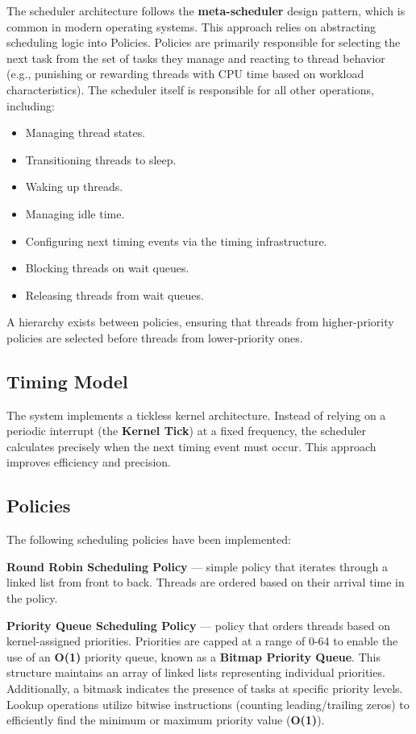 \documentclass[a4paper,10pt,twoside]{report}
\theoremstyle{definition}
\begin{document}
The scheduler architecture follows the \textbf{meta-scheduler} design pattern, which is common in modern operating systems. This approach relies on abstracting scheduling logic into Policies. Policies are primarily responsible for selecting the next task from the set of tasks they manage and reacting to thread behavior (e.g., punishing or rewarding threads with CPU time based on workload characteristics). The scheduler itself is responsible for all other operations, including:
\begin{itemize}
    \item Managing thread states.
    \item Transitioning threads to sleep.
    \item Waking up threads.
    \item Managing idle time.
    \item Configuring next timing events via the timing infrastructure.
    \item Blocking threads on wait queues.
    \item Releasing threads from wait queues.
\end{itemize}
A hierarchy exists between policies, ensuring that threads from higher-priority policies are selected before threads from lower-priority ones.

\subsection{Timing Model}

The system implements a tickless kernel architecture. Instead of relying on a periodic interrupt (the \textbf{Kernel Tick}) at a fixed frequency, the scheduler calculates precisely when the next timing event must occur. This approach improves efficiency and precision.

\subsection{Policies}
\label{subsec:policiesOverview}

The following scheduling policies have been implemented:

\textbf{Round Robin Scheduling Policy} --- simple policy that iterates through a linked list from front to back. Threads are ordered based on their arrival time in the policy.

\textbf{Priority Queue Scheduling Policy} --- policy that orders threads based on kernel-assigned priorities. Priorities are capped at a range of 0-64 to enable the use of an \textbf{O(1)} priority queue, known as a \textbf{Bitmap Priority Queue}. This structure maintains an array of linked lists representing individual priorities. Additionally, a bitmask indicates the presence of tasks at specific priority levels. Lookup operations utilize bitwise instructions (counting leading/trailing zeros) to efficiently find the minimum or maximum priority value (\textbf{O(1)}).
\end{document}

